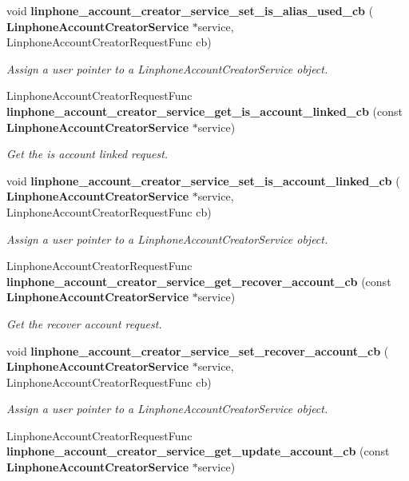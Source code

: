 \begin{DoxyCompactItemize}
void \textbf{ linphone\+\_\+account\+\_\+creator\+\_\+service\+\_\+set\+\_\+is\+\_\+alias\+\_\+used\+\_\+cb} (\textbf{ Linphone\+Account\+Creator\+Service} $\ast$service, Linphone\+Account\+Creator\+Request\+Func cb)
\begin{DoxyCompactList}\small\item\em Assign a user pointer to a Linphone\+Account\+Creator\+Service object. \end{DoxyCompactList}\item 
Linphone\+Account\+Creator\+Request\+Func \textbf{ linphone\+\_\+account\+\_\+creator\+\_\+service\+\_\+get\+\_\+is\+\_\+account\+\_\+linked\+\_\+cb} (const \textbf{ Linphone\+Account\+Creator\+Service} $\ast$service)
\begin{DoxyCompactList}\small\item\em Get the is account linked request. \end{DoxyCompactList}\item 
void \textbf{ linphone\+\_\+account\+\_\+creator\+\_\+service\+\_\+set\+\_\+is\+\_\+account\+\_\+linked\+\_\+cb} (\textbf{ Linphone\+Account\+Creator\+Service} $\ast$service, Linphone\+Account\+Creator\+Request\+Func cb)
\begin{DoxyCompactList}\small\item\em Assign a user pointer to a Linphone\+Account\+Creator\+Service object. \end{DoxyCompactList}\item 
Linphone\+Account\+Creator\+Request\+Func \textbf{ linphone\+\_\+account\+\_\+creator\+\_\+service\+\_\+get\+\_\+recover\+\_\+account\+\_\+cb} (const \textbf{ Linphone\+Account\+Creator\+Service} $\ast$service)
\begin{DoxyCompactList}\small\item\em Get the recover account request. \end{DoxyCompactList}\item 
void \textbf{ linphone\+\_\+account\+\_\+creator\+\_\+service\+\_\+set\+\_\+recover\+\_\+account\+\_\+cb} (\textbf{ Linphone\+Account\+Creator\+Service} $\ast$service, Linphone\+Account\+Creator\+Request\+Func cb)
\begin{DoxyCompactList}\small\item\em Assign a user pointer to a Linphone\+Account\+Creator\+Service object. \end{DoxyCompactList}\item 
Linphone\+Account\+Creator\+Request\+Func \textbf{ linphone\+\_\+account\+\_\+creator\+\_\+service\+\_\+get\+\_\+update\+\_\+account\+\_\+cb} (const \textbf{ Linphone\+Account\+Creator\+Service} $\ast$service)

\end{DoxyCompactItemize}
